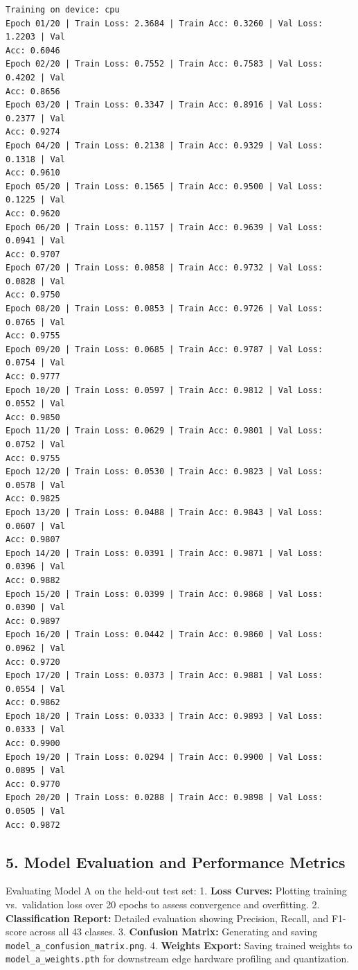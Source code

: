 \documentclass[11pt]{article}
\begin{document}
    \begin{Verbatim}[commandchars=\\\{\}]
Training on device: cpu
Epoch 01/20 | Train Loss: 2.3684 | Train Acc: 0.3260 | Val Loss: 1.2203 | Val
Acc: 0.6046
Epoch 02/20 | Train Loss: 0.7552 | Train Acc: 0.7583 | Val Loss: 0.4202 | Val
Acc: 0.8656
Epoch 03/20 | Train Loss: 0.3347 | Train Acc: 0.8916 | Val Loss: 0.2377 | Val
Acc: 0.9274
Epoch 04/20 | Train Loss: 0.2138 | Train Acc: 0.9329 | Val Loss: 0.1318 | Val
Acc: 0.9610
Epoch 05/20 | Train Loss: 0.1565 | Train Acc: 0.9500 | Val Loss: 0.1225 | Val
Acc: 0.9620
Epoch 06/20 | Train Loss: 0.1157 | Train Acc: 0.9639 | Val Loss: 0.0941 | Val
Acc: 0.9707
Epoch 07/20 | Train Loss: 0.0858 | Train Acc: 0.9732 | Val Loss: 0.0828 | Val
Acc: 0.9750
Epoch 08/20 | Train Loss: 0.0853 | Train Acc: 0.9726 | Val Loss: 0.0765 | Val
Acc: 0.9755
Epoch 09/20 | Train Loss: 0.0685 | Train Acc: 0.9787 | Val Loss: 0.0754 | Val
Acc: 0.9777
Epoch 10/20 | Train Loss: 0.0597 | Train Acc: 0.9812 | Val Loss: 0.0552 | Val
Acc: 0.9850
Epoch 11/20 | Train Loss: 0.0629 | Train Acc: 0.9801 | Val Loss: 0.0752 | Val
Acc: 0.9755
Epoch 12/20 | Train Loss: 0.0530 | Train Acc: 0.9823 | Val Loss: 0.0578 | Val
Acc: 0.9825
Epoch 13/20 | Train Loss: 0.0488 | Train Acc: 0.9843 | Val Loss: 0.0607 | Val
Acc: 0.9807
Epoch 14/20 | Train Loss: 0.0391 | Train Acc: 0.9871 | Val Loss: 0.0396 | Val
Acc: 0.9882
Epoch 15/20 | Train Loss: 0.0399 | Train Acc: 0.9868 | Val Loss: 0.0390 | Val
Acc: 0.9897
Epoch 16/20 | Train Loss: 0.0442 | Train Acc: 0.9860 | Val Loss: 0.0962 | Val
Acc: 0.9720
Epoch 17/20 | Train Loss: 0.0373 | Train Acc: 0.9881 | Val Loss: 0.0554 | Val
Acc: 0.9862
Epoch 18/20 | Train Loss: 0.0333 | Train Acc: 0.9893 | Val Loss: 0.0333 | Val
Acc: 0.9900
Epoch 19/20 | Train Loss: 0.0294 | Train Acc: 0.9900 | Val Loss: 0.0895 | Val
Acc: 0.9770
Epoch 20/20 | Train Loss: 0.0288 | Train Acc: 0.9898 | Val Loss: 0.0505 | Val
Acc: 0.9872
    \end{Verbatim}

    \subsection{5. Model Evaluation and Performance
Metrics}\label{model-evaluation-and-performance-metrics}

Evaluating Model A on the held-out test set: 1. \textbf{Loss Curves:}
Plotting training vs.~validation loss over 20 epochs to assess
convergence and overfitting. 2. \textbf{Classification Report:} Detailed
evaluation showing Precision, Recall, and F1-score across all 43
classes. 3. \textbf{Confusion Matrix:} Generating and saving
\texttt{model\_a\_confusion\_matrix.png}. 4. \textbf{Weights Export:}
Saving trained weights to \texttt{model\_a\_weights.pth} for downstream
edge hardware profiling and quantization.
\end{document}
